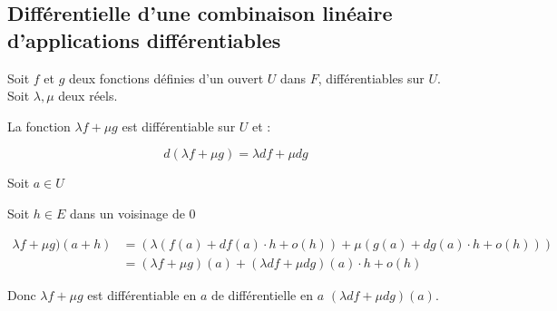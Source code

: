 \documentclass[a4paper,12pt]{book}
\newcommand{\Prop}[2]{\begin{tcolorbox}[sharp corners, colback=white,colframe=red!90!black!75, title=Proposition : #1]#2\end{tcolorbox}}
\newcommand{\Pre}[1]{\begin{tcolorbox}[sharp corners, colback=white,colframe=green!60!green!30!black!75, title=Preuve]#1\end{tcolorbox}}
\begin{document}
\subsection{Différentielle d'une combinaison linéaire d'applications différentiables}
\Prop{}{Soit $f$ et $g$ deux fonctions définies d'un ouvert $U$ dans $F$, différentiables sur $U$. Soit $\lambda, \mu$ deux réels.
\par La fonction $\lambda f +\mu g$ est différentiable sur $U$ et :
\par $$d(\lambda f+\mu g) = \lambda df+\mu dg$$}
\Pre{Soit $a\in U$
\par Soit $h\in E$ dans un voisinage de $0$
\par \begin{align*}\lambda f +\mu g)(a+h)& = (\lambda (f(a)+df(a)\cdot h + o(h)) + \mu (g(a)+dg(a)\cdot h + o(h))) \\ &= (\lambda f + \mu g)(a) +(\lambda df+\mu dg)(a)\cdot h + o(h)\end{align*}
\par Donc $\lambda f + \mu g$ est différentiable en $a$ de différentielle en $a$ $(\lambda df+\mu dg)(a)$.}
\end{document}
